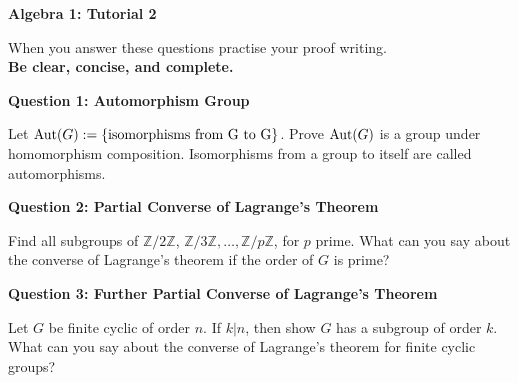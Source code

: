 \documentclass[11pt,twoside, a4paper]{report}
\theoremstyle{plain}
\theoremstyle{definition}
\newcommand{\Aut}{\textnormal{Aut}}%
\begin{document}
\begin{center}
 \noindent\makebox[\linewidth]{\rule{14cm}{1.5pt}} 
{\bf Algebra 1: Tutorial 2 }
 \noindent\makebox[\linewidth]{\rule{14cm}{1.5pt}}  
 \noindent\makebox[\linewidth]{\rule{14cm}{3pt}}
\end{center}

\noindent When you answer these questions practise your proof writing.\\
  {\bf Be clear, concise, and complete.}
  
  


  
\begin{center}
{\bf Question 1: Automorphism Group}
\end{center}

Let $\Aut(G):=\{\textnormal{isomorphisms from G to G}\}$. Prove $\Aut(G)$ is a group under homomorphism composition. Isomorphisms from a group to itself are called automorphisms.


  



  
\begin{center}
{\bf Question 2: Partial Converse of Lagrange's Theorem}
\end{center}

Find all subgroups of $\mathbb{Z}/2\mathbb{Z}$, $\mathbb{Z}/3\mathbb{Z}, \dots , \mathbb{Z}/p\mathbb{Z}$, for $p$ prime. What can you say about the converse of Lagrange's theorem if the order of $G$ is prime?

  
\begin{center}
{\bf Question 3: Further Partial Converse of Lagrange's Theorem}
\end{center}

Let $G$ be finite cyclic of order $n$. If $k|n$, then show $G$ has a subgroup of order $k$. What can you say about the converse of Lagrange's theorem for finite cyclic groups?
\end{document}
